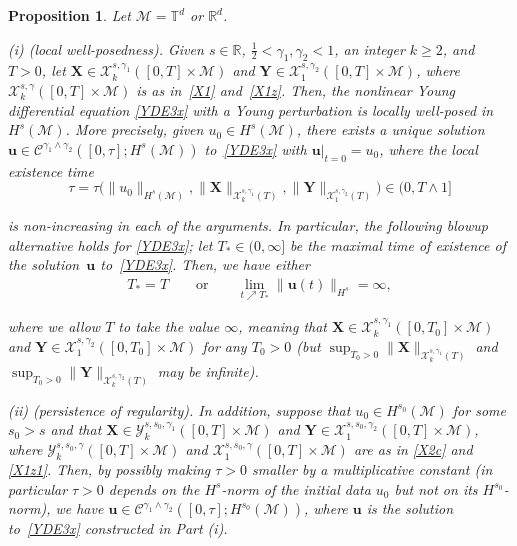 \documentclass[letterpaper, 11pt,  reqno]{amsart}
\newtheorem{proposition}[theorem]{Proposition}
\newcommand{\1}{\hspace{0.5mm}\textup{I}\hspace{0.5mm}}
\newcommand{\noi}{\noindent}
\newcommand{\R}{\mathbb{R}}
\newcommand{\T}{\mathbb{T}}
\newcommand{\g}{\gamma}
\newcommand{\M}{\mathcal{M}}
\newcommand{\cC}{\mathcal{C}}
\newcommand{\cX}{\mathcal{X}}
\newcommand{\cY}{\mathcal{Y}}
\newcommand{\uu}{\mathbf{u}}
\newcommand{\XX}{\mathbf{X}}
\newcommand{\YY}{\mathbf{Y}}
\numberwithin{equation}{section}
\numberwithin{theorem}{section}
\begin{document}
\begin{proposition}
\label{PROP:main}
Let $\M = \T^d$ or $\R^d$.

\smallskip

\noi
\textup{(i) (local well-posedness).}
Given   $s \in \R$, $\frac 12 < \g_1, \g_2  < 1$,  
an integer $k \ge 2$, and $T > 0$, 
let     $\XX \in \cX^{s, \g_1}_k([0, T]\times \M)$
and 
$\YY \in \cX^{s, \g_2}_1([0, T]\times \M)$, 
where $ \cX^{s, \g}_k([0, T]\times \M)$ is  as  in~\eqref{X1}
and~\eqref{X1z}.
Then, 
 the nonlinear Young differential equation \eqref{YDE3x} with 
a Young perturbation
is locally well-posed in $H^s(\M)$.
More precisely, given  $u_0\in H^s(\M)$, 
there exists
 a unique solution $\uu \in \cC^{\g_1\wedge \g_2} ([0, \tau]; H^s(\M))$
to~\eqref{YDE3x}  
with $\uu|_{t= 0} = u_0$, where the local existence time 
\[\tau = 
\tau\Big(\|u_0\|_{H^s(\M)}, \|\XX\|_{\cX^{s, \g_1}_k(T)},
\|\YY\|_{\cX^{s, \g_2}_1(T)}\Big) \in (0, T\wedge 1]\]

\noi
\noi
is non-increasing in each of the arguments.
In particular, 
the following blowup alternative holds
for \eqref{YDE3x}\textup{;}
let $T_* \in (0, \infty]$ be the maximal time of existence
of the solution~$\uu$ to~\eqref{YDE3x}.
Then, we have either 
\begin{align}
T_* = T \qquad \text{or} \qquad \lim_{t \nearrow T_*} \|\uu(t)\|_{H^s} = \infty, 
\label{BA1}
\end{align}

\noi
where we allow $T$ to take the value $\infty$, 
meaning that 
    $\XX \in \cX^{s, \g_1}_k([0, T_0]\times \M)$
and 
$\YY \in \cX^{s, \g_2}_1([0, T_0]\times \M)$
for any $T_0 > 0$ 
\textup{(}but $\sup_{T_0 > 0 } \| \XX\|_{\cX^{s, \g_1}_k(T)}$
and $\sup_{T_0 > 0 } \| \YY\|_{\cX^{s, \g_2}_k(T)}$
 may be infinite\textup{)}.






\smallskip

\noi
\textup{(ii) (persistence of regularity).}
In addition, suppose that $u_0 \in H^{s_0}(\M)$ for some $s_0 > s$
and that  $\XX \in \cY^{s, s_0, \g_1}_k([0, T]\times \M)$
and $\YY \in \cX^{s, s_0, \g_2}_1([0, T]\times \M)$, 
where $\cY^{s, s_0, \g}_k([0, T]\times \M)$  
and 
 $\cX^{s, s_0, \g}_1([0, T]\times \M)$  
 are as in \eqref{X2c}
and 
\eqref{X1z1}.
Then, 
by possibly making $\tau > 0$ smaller by a multiplicative constant 
\textup{(}in particular $\tau > 0$
depends on the $H^s$-norm of the initial data $u_0$
but not on its $H^{s_0}$-norm\textup{)}, 
we have $\uu \in \cC^{\g_1\wedge \g_2} ([0, \tau]; H^{s_0}(\M))$, 
 where $\uu$ is the solution to~\eqref{YDE3x}
 constructed in Part (i).




\end{proposition}
\end{document}
